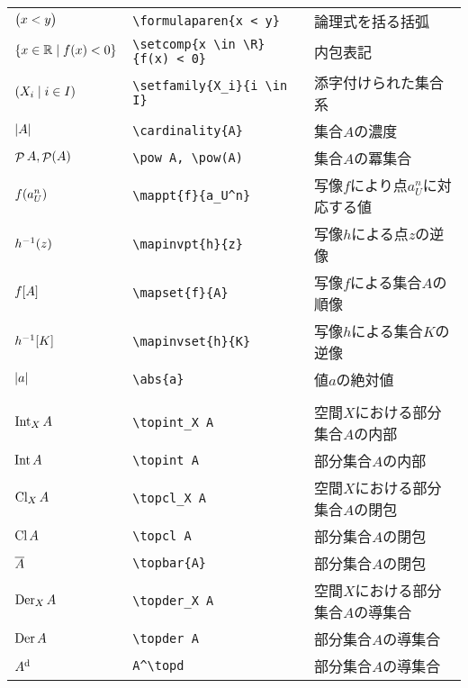 \documentclass[uplatex, dvipdfmx, 12pt, crop=false]{standalone}
\begin{document}
\begin{table}[htb]
\begin{tabular}{ll@{\qquad}l}
		$\bigl({x < y}\bigr)$                    & \verb|\formulaparen{x < y}|                    & 論理式を括る括弧                   \\
		$\setcomp{x \in \R}{f(x) < 0}$            & \verb|\setcomp{x \in \R}{f(x) < 0}|            & 内包表記                           \\
		$\setfamily{X_i}{i \in I}$                & \verb|\setfamily{X_i}{i \in I}|                & 添字付けられた集合系               \\
		$\left|A\right|$                         & \verb|\cardinality{A}|                         & 集合$A$の濃度                      \\
		$\mathop{\mathcal{P}}\nolimits A, \mathop{\mathcal{P}}\nolimits(A)$                         & \verb|\pow A, \pow(A)|                         & 集合$A$の冪集合                    \\
		$\mappt{f}{a_U^n}$                        & \verb|\mappt{f}{a_U^n}|                        & 写像$f$により点$a_U^n$に対応する値 \\
		$\mapinvpt{h}{z}$                         & \verb|\mapinvpt{h}{z}|                         & 写像$h$による点$z$の逆像           \\
		$\mapset{f}{A}$                           & \verb|\mapset{f}{A}|                           & 写像$f$による集合$A$の順像         \\
		$\mapinvset{h}{K}$                        & \verb|\mapinvset{h}{K}|                        & 写像$h$による集合$K$の逆像         \\
		$\left|a\right|$                                 & \verb|\abs{a}|                                 & 値$a$の絶対値                      \\
		\hline

		\tablesubtitle{位相空間に関する演算} \\
		$\mathop{\mathrm{Int}}\nolimits_X A$ & \verb|\topint_X A| & 空間$X$における部分集合$A$の内部   \\
		$\mathop{\mathrm{Int}}\nolimits A$   & \verb|\topint A|   & 部分集合$A$の内部                  \\
		$\mathop{\mathrm{Cl}}\nolimits_X A$  & \verb|\topcl_X A|  & 空間$X$における部分集合$A$の閉包   \\
		$\mathop{\mathrm{Cl}}\nolimits A$    & \verb|\topcl A|    & 部分集合$A$の閉包                  \\
		$\overline{A}$  & \verb|\topbar{A}|  & 部分集合$A$の閉包                  \\
		$\mathop{\mathrm{Der}}\nolimits_X A$ & \verb|\topder_X A| & 空間$X$における部分集合$A$の導集合 \\
		$\mathop{\mathrm{Der}}\nolimits A$   & \verb|\topder A|   & 部分集合$A$の導集合                \\
		$A^{\mathrm{d}}$     & \verb|A^\topd|     & 部分集合$A$の導集合                \\
		\hline


\end{tabular}
\end{table}
\end{document}
